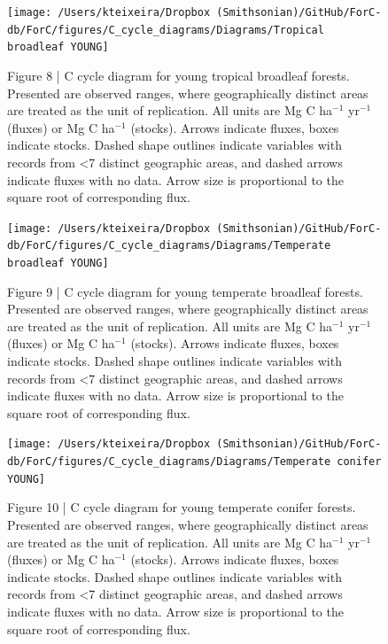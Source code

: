 \documentclass[
]{article}
\begin{document}
\newpage
\begin{landscape}
\begin{figure}[H]

{\centering \texttt{[image: /Users/kteixeira/Dropbox (Smithsonian)/GitHub/ForC-db/ForC/figures/C\_cycle\_diagrams/Diagrams/Tropical broadleaf YOUNG]} 

}

\caption{Figure 8 | C cycle diagram for young tropical broadleaf forests. Presented are observed ranges, where geographically distinct areas are treated as the unit of replication. All units are Mg C ha$^{-1}$ yr$^{-1}$ (fluxes) or Mg C ha$^{-1}$ (stocks). Arrows indicate fluxes, boxes indicate stocks. Dashed shape outlines indicate variables with records from <7 distinct geographic areas, and dashed arrows indicate fluxes with no data. Arrow size is proportional to the square root of corresponding flux.}\label{fig:unnamed-chunk-14}
\end{figure}

\begin{figure}[H]

{\centering \texttt{[image: /Users/kteixeira/Dropbox (Smithsonian)/GitHub/ForC-db/ForC/figures/C\_cycle\_diagrams/Diagrams/Temperate broadleaf YOUNG]} 

}

\caption{Figure 9 | C cycle diagram for young temperate broadleaf forests. Presented are observed ranges, where geographically distinct areas are treated as the unit of replication. All units are Mg C ha$^{-1}$ yr$^{-1}$ (fluxes) or Mg C ha$^{-1}$ (stocks). Arrows indicate fluxes, boxes indicate stocks. Dashed shape outlines indicate variables with records from <7 distinct geographic areas, and dashed arrows indicate fluxes with no data. Arrow size is proportional to the square root of corresponding flux.}\label{fig:unnamed-chunk-15}
\end{figure}

\begin{figure}[H]

{\centering \texttt{[image: /Users/kteixeira/Dropbox (Smithsonian)/GitHub/ForC-db/ForC/figures/C\_cycle\_diagrams/Diagrams/Temperate conifer YOUNG]} 

}

\caption{Figure 10 | C cycle diagram for young temperate conifer forests. Presented are observed ranges, where geographically distinct areas are treated as the unit of replication. All units are Mg C ha$^{-1}$ yr$^{-1}$ (fluxes) or Mg C ha$^{-1}$ (stocks). Arrows indicate fluxes, boxes indicate stocks. Dashed shape outlines indicate variables with records from <7 distinct geographic areas, and dashed arrows indicate fluxes with no data. Arrow size is proportional to the square root of corresponding flux.}\label{fig:unnamed-chunk-16}
\end{figure}


\end{landscape}
\end{document}
